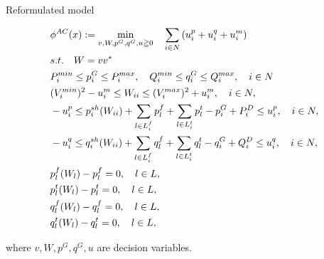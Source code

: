 \documentclass[xcolor=dvipsnames]{beamer}
\newcommand{\p}[1]{p^{#1}}
\newcommand{\q}[1]{q^{#1}}
\newcommand{\ii}{i}
\newcommand{\llll}{l}
\newcommand{\from}{f}
\newcommand{\tto}{t}
\newcommand{\WW}{W}
\newcommand{\Lines}{L}
\begin{document}
\begin{frame}{Reformulated model}
\begin{footnotesize}
\begin{subequations}
\begin{align}
&\phi^{AC}(x) := \min_{v,W,p^G,q^G,u\geqq 0} \quad 
  \sum_{i \in N} \left( u_i^p + u_i^q + u_i^{m} \right) \notag \\
  & s.t. \quad W = v v^* \notag \\
  & P_i^{min} \leq p_i^G \leq P_i^{max}, \quad Q_i^{min} \leq q_i^G \leq Q_i^{max}, \quad i\in N \notag \\
  & (V_i^{min})^2 - u_i^{m} \leq W_{ii} \leq (V_i^{max})^2 + u_i^{m},\quad i\in N, \notag \\
  & -u_i^p \leq  p_i^{sh}(\WW_{ii}) 
+ \sum_{\llll \in \Lines_\ii^{\from} } \p{\from}_{\llll} 
	+\sum_{\llll \in \Lines_\ii^{\tto} } \p{\tto}_{\llll} - p^G_i + P^D_i \le u_i^p, \quad i\in N, \notag\\ 
  &-u_i^q \leq q_\ii^{sh}(\WW_{\ii\ii}) + \sum_{\llll \in \Lines_\ii^{\from} } \q{\from}_{\llll} +\sum_{\llll \in \Lines_\ii^{\tto} } \q{\tto}_{\llll} - q^G_i + Q^D_i \le u_i^q, \quad i\in N, \notag \\
& \p{\from}_{\llll}(\WW_\llll) - \p{\from}_{\llll} = 0, \quad \llll \in L, \notag \\
& \p{\tto}_{\llll}(\WW_\llll) - \p{\tto}_{\llll} = 0, \quad \llll \in L, \notag \\
& \q{\from}_{\llll}(\WW_\llll) - \q{\from}_{\llll} = 0, \quad \llll \in L, \notag \\
& \q{\tto}_{\llll}(\WW_\llll) - \q{\tto}_{\llll} = 0, \quad \llll \in L, \notag 
\end{align}
\end{subequations}
\end{footnotesize}
where $v,W,p^G,q^G,u$ are decision variables. 
\end{frame}
\end{document}
